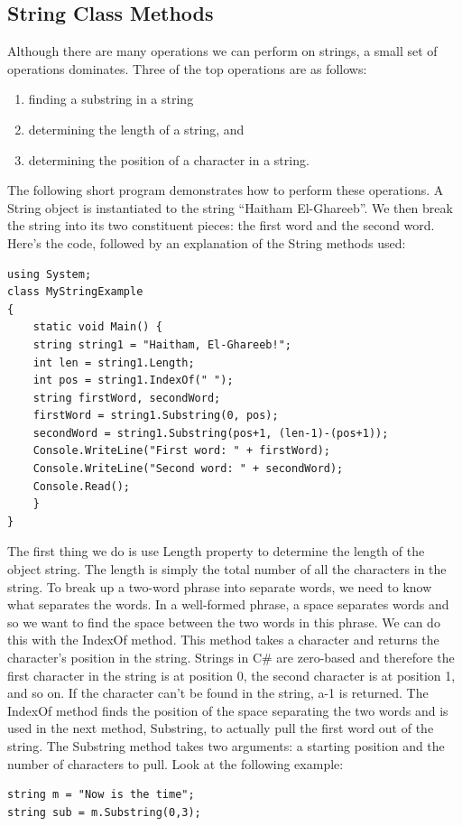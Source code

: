 \documentclass[12pt,a4paper,final,twoside,titlepage]{book}
\begin{document}
\subsection{String Class Methods}
Although there are many operations we can perform on strings, a small set of operations dominates. Three of the top operations are as follows: 
\begin{enumerate}
\item finding a substring in a string
\item determining the length of a string, and 
\item determining the position of a character in a string.
\end{enumerate}
The following short program demonstrates how to perform these operations. A String object is instantiated to the string “Haitham El-Ghareeb”. We then break the string into its two constituent pieces: the first word and the second word. Here’s the code, followed by an explanation of the String methods used:
\begin{lstlisting}
using System;
class MyStringExample
{
	static void Main() {
	string string1 = "Haitham, El-Ghareeb!";
	int len = string1.Length;
	int pos = string1.IndexOf(" "); 
	string firstWord, secondWord; 
	firstWord = string1.Substring(0, pos); 
	secondWord = string1.Substring(pos+1, (len-1)-(pos+1));
  	Console.WriteLine("First word: " + firstWord);
  	Console.WriteLine("Second word: " + secondWord);
  	Console.Read();
	} 
}
\end{lstlisting}
The first thing we do is use Length property to determine the length of the object string. The length is simply the total number of all the characters in the string. To break up a two-word phrase into separate words, we need to know what separates the words. In a well-formed phrase, a space separates words and so we want to find the space between the two words in this phrase. We can do this with the IndexOf method. This method takes a character and returns the character’s position in the string. Strings in C\# are zero-based and therefore the first character in the string is at position 0, the second character is at position 1, and so on. If the character can’t be found in the string, a-1 is returned. The IndexOf method finds the position of the space separating the two words and is used in the next method, Substring, to actually pull the first word out of the string. The Substring method takes two arguments: a starting position and the number of characters to pull. Look at the following example:
\begin{lstlisting}
string m = "Now is the time";
string sub = m.Substring(0,3);
\end{lstlisting}
\end{document}
